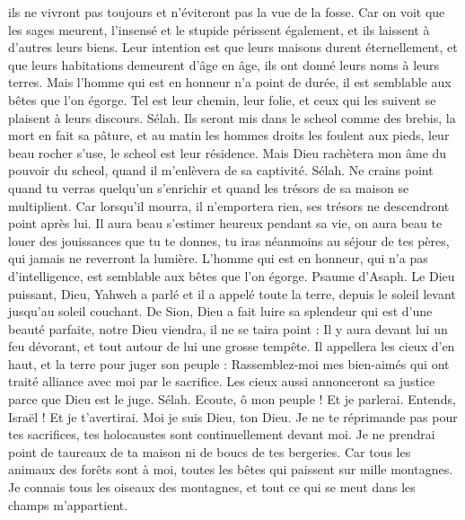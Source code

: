 \begin{multicols}{2}
ils ne vivront pas toujours et n'éviteront pas la vue de la fosse.
Car on voit que les sages meurent, l'insensé et le stupide périssent également, et ils laissent à d'autres leurs biens.
Leur intention est que leurs maisons durent éternellement, et que leurs habitations demeurent d'âge en âge, ils ont donné leurs noms à leurs terres.
Mais l'homme qui est en honneur n'a point de durée, il est semblable aux bêtes que l'on égorge.
Tel est leur chemin, leur folie, et ceux qui les suivent se plaisent à leurs discours. Sélah.
Ils seront mis dans le scheol comme des brebis, la mort en fait sa pâture, et au matin les hommes droits les foulent aux pieds, leur beau rocher s'use, le scheol est leur résidence.
Mais Dieu rachètera mon âme du pouvoir du scheol, quand il m'enlèvera de sa captivité. Sélah.
Ne crains point quand tu verras quelqu'un s'enrichir et quand les trésors de sa maison se multiplient.
Car lorsqu'il mourra, il n'emportera rien, ses trésors ne descendront point après lui.
Il aura beau s'estimer heureux pendant sa vie, on aura beau te louer des jouissances que tu te donnes,
tu iras néanmoins au séjour de tes pères, qui jamais ne reverront la lumière.
L'homme qui est en honneur, qui n'a pas d'intelligence, est semblable aux bêtes que l'on égorge.
\VerseOne{}Psaume d'Asaph. Le Dieu puissant, Dieu, Yahweh a parlé et il a appelé toute la terre, depuis le soleil levant jusqu'au soleil couchant.
De Sion, Dieu a fait luire sa splendeur qui est d'une beauté parfaite,
notre Dieu viendra, il ne se taira point : Il y aura devant lui un feu dévorant, et tout autour de lui une grosse tempête.
Il appellera les cieux d'en haut, et la terre pour juger son peuple :
Rassemblez-moi mes bien-aimés qui ont traité alliance avec moi par le sacrifice.
Les cieux aussi annonceront sa justice parce que Dieu est le juge. Sélah.
Ecoute, ô mon peuple ! Et je parlerai. Entends, Israël ! Et je t'avertirai. Moi je suis Dieu, ton Dieu.
Je ne te réprimande pas pour tes sacrifices, tes holocaustes sont continuellement devant moi.
Je ne prendrai point de taureaux de ta maison ni de boucs de tes bergeries.
Car tous les animaux des forêts sont à moi, toutes les bêtes qui paissent sur mille montagnes.
Je connais tous les oiseaux des montagnes, et tout ce qui se meut dans les champs m'appartient.

\end{multicols}

